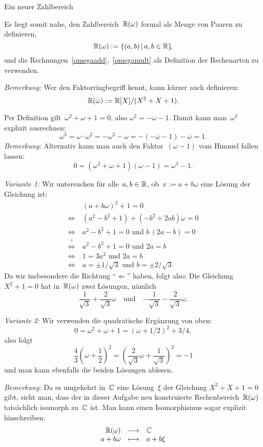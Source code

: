 \documentclass{algblatt}
\begin{document}
\begin{aufgabe}{Ein neuer Zahlbereich}
\begin{loesungE}
Es liegt somit nahe, den Zahlbereich~$\mathbb{R}(\omega)$ formal als Menge von Paaren zu
definieren,
\[ \mathbb{R}(\omega) := \{ (a,b) \,|\, a,b \in \mathbb{R} \}\!, \]
und die Rechnungen~\eqref{omegaadd},~\eqref{omegamult} als Definition der
Rechenarten zu verwenden.

\emph{Bemerkung:} Wer den Faktorringbegriff kennt, kann kürzer auch definieren:
\[ \mathbb{R}(\omega) := \mathbb{R}[X]/(X^2 + X + 1). \]

\item Per Definition gilt~$\omega^2 + \omega + 1 = 0$, also $\omega^2 = -\omega
- 1$. Damit kann man~$\omega^3$ explizit ausrechnen:
\[ \omega^3 = \omega \cdot \omega^2 = -\omega^2 - \omega = -(-\omega - 1) -
\omega = 1. \]
\emph{Bemerkung:} Alternativ kann man auch den Faktor~$(\omega-1)$ vom Himmel
fallen lassen:
\[ 0 = (\omega^2 + \omega + 1) (\omega - 1) = \omega^3 - 1. \]

\item \emph{Variante 1:} Wir untersuchen für alle~$a,b \in \mathbb{R}$, ob~$x := a + b
\omega$ eine Lösung der Gleichung ist:
\begin{align*}
  & (a + b\omega)^2 + 1 = 0 \\
  \Longleftrightarrow\ &
  (a^2 - b^2 + 1) + (-b^2 + 2ab) \omega = 0 \\
  \Longleftrightarrow\ &
  a^2 - b^2 + 1 = 0 \text{ und } b \, (2a-b) = 0 \\
  \stackrel{?}{\Longleftrightarrow}\ &
  a^2 - b^2 + 1 = 0 \text{ und } 2a = b \\
  \Longleftrightarrow\ &
  1 = 3 a^2 \text{ und } 2a = b \\
  \Longleftrightarrow\ &
  a = \pm 1 / \sqrt{3} \text{ und } b = \pm 2 / \sqrt{3}
\end{align*}
Da wir insbesondere die Richtung "`$\Leftarrow$"' haben, folgt also: Die
Gleichung~$X^2 + 1 = 0$ hat in~$\mathbb{R}(\omega)$ zwei Lösungen, nämlich
\[ \frac{1}{\sqrt{3}} + \frac{2}{\sqrt{3}} \omega \quad\text{und}\quad
  {-\frac{1}{\sqrt{3}} - \frac{2}{\sqrt{3}} \omega}. \]

\emph{Variante 2:} Wir verwenden die quadratische Ergänzung von oben:
\[ 0 = \omega^2 + \omega + 1 = (\omega + 1/2)^2 + 3/4, \]
also folgt
\[ \frac{4}{3} \left(\omega + \frac{1}{2}\right)^2 = \left(
  \frac{2}{\sqrt{3}} \omega + \frac{1}{\sqrt{3}}
\right)^2 = -1 \]
und man kann ebenfalls die beiden Lösungen ablesen.

\emph{Bemerkung:} Da es umgekehrt in~$\mathbb{C}$ eine Lösung~$\xi$ der Gleichung
$X^2+X+1=0$ gibt, sieht man, dass der in dieser Aufgabe neu konstruierte
Rechenbereich~$\mathbb{R}(\omega)$ tatsächlich isomorph zu~$\mathbb{C}$ ist. Man kann einen
Isomorphismus sogar explizit hinschreiben:
\[ \begin{array}{@{}rcl@{}}
  \RR(\omega) &\longrightarrow& \CC \\
  a+b\omega &\longmapsto& a+b\xi
\end{array} \]
\end{loesungE}
\end{aufgabe}
\end{document}

